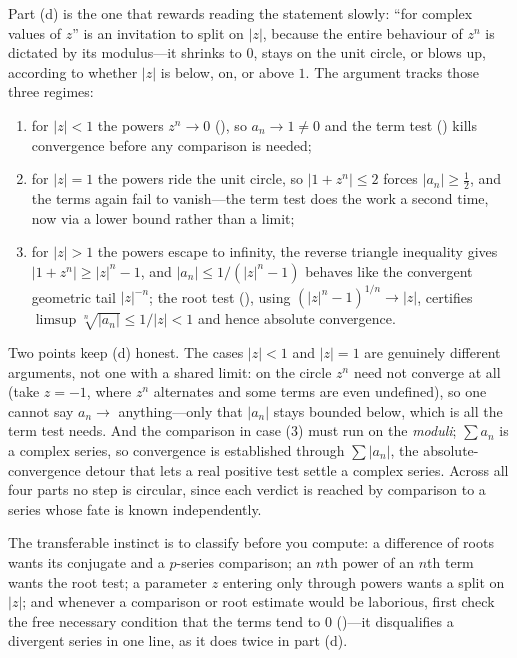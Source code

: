 \documentclass[main.tex]{subfiles}
\begin{document}
\begin{Reflection}
Part (d) is the one that rewards reading the statement slowly: ``for complex values of $z$'' is an
invitation to split on $|z|$, because the entire behaviour of $z^n$ is dictated by its modulus---it
shrinks to $0$, stays on the unit circle, or blows up, according to whether $|z|$ is below, on, or
above $1$. The argument tracks those three regimes:
\begin{enumerate}[leftmargin=1.7em,itemsep=3pt,topsep=2pt,label=\textnormal{(\arabic*)}]
  \item for $|z|<1$ the powers $z^n\to 0$ (), so $a_n\to 1\neq 0$ and the term test
        () kills convergence before any comparison is needed;
  \item for $|z|=1$ the powers ride the unit circle, so $|1+z^n|\le 2$ forces $|a_n|\ge\tfrac12$, and
        the terms again fail to vanish---the term test does the work a second time, now via a lower
        bound rather than a limit;
  \item for $|z|>1$ the powers escape to infinity, the reverse triangle inequality gives
        $|1+z^n|\ge|z|^n-1$, and $|a_n|\le 1/(|z|^n-1)$ behaves like the convergent geometric tail
        $|z|^{-n}$; the root test (), using $(|z|^n-1)^{1/n}\to|z|$, certifies
        $\limsup\sqrt[n]{|a_n|}\le 1/|z|<1$ and hence absolute convergence.
\end{enumerate}

Two points keep (d) honest. The cases $|z|<1$ and $|z|=1$ are genuinely different arguments, not one
with a shared limit: on the circle $z^n$ need not converge at all (take $z=-1$, where $z^n$ alternates
and some terms are even undefined), so one cannot say $a_n\to$ anything---only that $|a_n|$ stays
bounded below, which is all the term test needs. And the comparison in case (3) must run on the
\emph{moduli}; $\sum a_n$ is a complex series, so convergence is established through $\sum|a_n|$, the
absolute-convergence detour that lets a real positive test settle a complex series. Across all four
parts no step is circular, since each verdict is reached by comparison to a series whose fate is known
independently.

The transferable instinct is to classify before you compute: a difference of roots wants its
conjugate and a $p$-series comparison; an $n$th power of an $n$th term wants the root test; a parameter
$z$ entering only through powers wants a split on $|z|$; and whenever a comparison or root estimate
would be laborious, first check the free necessary condition that the terms tend to $0$
()---it disqualifies a divergent series in one line, as it does twice in part (d).
\end{Reflection}
\end{document}
